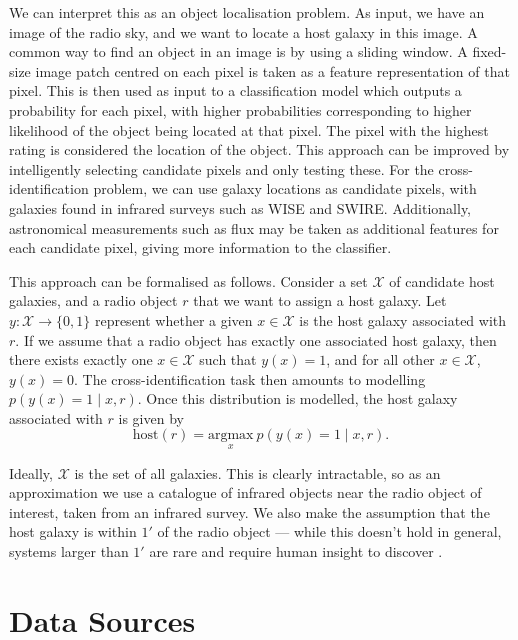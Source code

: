   We can interpret this as an object localisation problem. As input, we have an
  image of the radio sky, and we want to locate a host galaxy in this image. A
  common way to find an object in an image is by using a sliding window. A
  fixed-size image patch centred on each pixel is taken as a feature
  representation of that pixel. This is then used as input to a classification
  model which outputs a probability for each pixel, with higher probabilities
  corresponding to higher likelihood of the object being located at that pixel.
  The pixel with the highest rating is considered the location of the object.
  This approach can be improved by intelligently selecting candidate pixels and
  only testing these. For the cross-identification problem, we can use galaxy
  locations as candidate pixels, with galaxies found in infrared surveys such
  as WISE and SWIRE. Additionally, astronomical measurements such as flux may be taken as additional features for each candidate pixel, giving more information to the classifier.

  This approach can be formalised as follows. Consider a set $\mathcal X$ of
  candidate host galaxies, and a radio object $r$ that we want to assign a
  host galaxy. Let $y : \mathcal X \to \{0, 1\}$ represent whether a given $x
  \in \mathcal X$ is the host galaxy associated with $r$. If we assume that a
  radio object has exactly one associated host galaxy, then there exists
  exactly one $x \in \mathcal X$ such that $y(x) = 1$, and for all other $x \in
  \mathcal X$, $y(x) = 0$. The cross-identification task then amounts to
  modelling $p(y(x) = 1 \mid x, r)$. Once this distribution is modelled, the
  host galaxy associated with $r$ is given by
  \begin{equation}
      \label{eq:cross-identification}
      \mbox{host}(r) = \underset{x}{\mbox{argmax}}\ p(y(x) = 1 \mid x, r).
  \end{equation}

  Ideally, $\mathcal X$ is the set of all galaxies. This is clearly
  intractable, so as an approximation we use a catalogue of infrared objects
  near the radio object of interest, taken from an infrared survey. We also
  make the assumption that the host galaxy is within $1'$ of the radio object
  --- while this doesn't hold in general, systems larger than $1'$ are rare and
  require human insight to discover \citep{banfield16}.

\section{Data Sources}
\label{sec:data}

